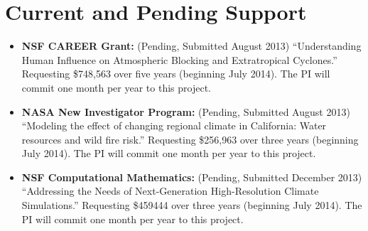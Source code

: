 \documentclass[11pt]{article}
\begin{document}
\appendix

\setcounter{section}{7}

\section{Current and Pending Support}

\begin{itemize}
\item \textbf{NSF CAREER Grant:}  (Pending, Submitted August 2013) ``Understanding Human Influence on Atmospheric Blocking and Extratropical Cyclones.''  Requesting \$748,563 over five years (beginning July 2014).  The PI will commit one month per year to this project.

\item \textbf{NASA New Investigator Program:}  (Pending, Submitted August 2013) ``Modeling the effect of changing regional climate in California: Water resources and wild fire risk.''  Requesting \$256,963 over three years (beginning July 2014).  The PI will commit one month per year to this project.

\item \textbf{NSF Computational Mathematics:}  (Pending, Submitted December 2013) ``Addressing the Needs of Next-Generation High-Resolution Climate Simulations.''  Requesting \$459444 over three years (beginning July 2014).  The PI will commit one month per year to this project.
\end{itemize}
\end{document}
